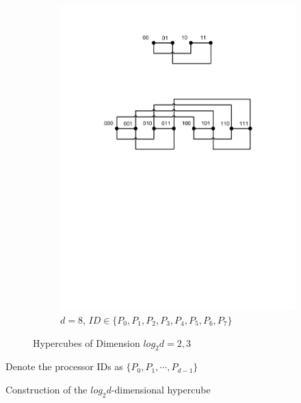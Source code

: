 \documentclass[submission]{iacrtrans}
\theoremstyle{plain}
\begin{document}
\begin{figure}[!tb]
\begin{subfigure}[t]{0.5\textwidth}\centering
\includegraphics[width=\textwidth]{./fig/HyperCube2.pdf}
\caption{$d=8$, $ID\in\{P_0,P_1,P_2,P_3,P_4,P_5,P_6,P_7\}$}
\label{fig:dit2}
\end{subfigure}
\caption{Hypercubes of Dimension $log_2d=2,3$}
\end{figure}

\begin{algorithm}[!tbh]
 \DontPrintSemicolon %
    Denote the processor IDs as $\{P_0,P_1,\cdots,P_{d-1}\}$\;
 \caption{Construction of the $log_2d$-dimensional hypercube}\label{alg:descript_hypercube}
\end{algorithm}
\end{document}

